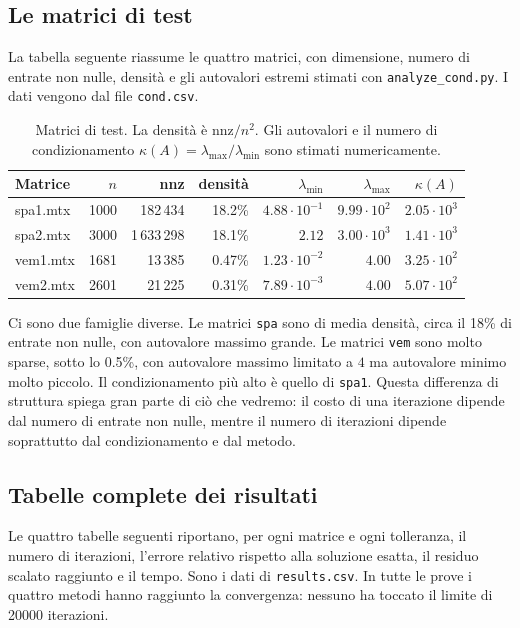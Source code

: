 \documentclass[11pt,a4paper]{article}
\begin{document}
\subsection{Le matrici di test}
La tabella seguente riassume le quattro matrici, con dimensione,
numero di entrate non nulle, densità e gli autovalori estremi stimati con
\texttt{analyze\_cond.py}. I dati vengono dal file \texttt{cond.csv}.

\begin{table}[H]
\centering
\caption{Matrici di test. La densità è $\text{nnz}/n^2$. Gli autovalori e il
numero di condizionamento $\kappa(A)=\lambda_{\max}/\lambda_{\min}$ sono stimati
numericamente.}
\label{tab:matrici}
\begin{tabular}{lrrrrrr}
\toprule
Matrice & $n$ & nnz & densità & $\lambda_{\min}$ & $\lambda_{\max}$ & $\kappa(A)$ \\
\midrule
spa1.mtx & 1000 & 182\,434 & 18.2\% & $4.88\cdot10^{-1}$ & $9.99\cdot10^{2}$ & $2.05\cdot10^{3}$ \\
spa2.mtx & 3000 & 1\,633\,298 & 18.1\% & $2.12$ & $3.00\cdot10^{3}$ & $1.41\cdot10^{3}$ \\
vem1.mtx & 1681 & 13\,385 & 0.47\% & $1.23\cdot10^{-2}$ & $4.00$ & $3.25\cdot10^{2}$ \\
vem2.mtx & 2601 & 21\,225 & 0.31\% & $7.89\cdot10^{-3}$ & $4.00$ & $5.07\cdot10^{2}$ \\
\bottomrule
\end{tabular}
\end{table}

\noindent Ci sono due famiglie diverse. Le matrici
\texttt{spa} sono di media densità, circa il 18\% di entrate non nulle, con
autovalore massimo grande. Le matrici \texttt{vem} sono molto sparse, sotto lo
0.5\%, con autovalore massimo limitato a $4$ ma autovalore minimo molto piccolo.
Il condizionamento più alto è quello di \texttt{spa1}. Questa differenza di
struttura spiega gran parte di ciò che vedremo: il costo di una iterazione
dipende dal numero di entrate non nulle, mentre il numero di iterazioni dipende
soprattutto dal condizionamento e dal metodo.

\subsection{Tabelle complete dei risultati}
Le quattro tabelle seguenti riportano, per ogni matrice e ogni
tolleranza, il numero di iterazioni, l'errore relativo rispetto alla soluzione
esatta, il residuo scalato raggiunto e il tempo. Sono i dati di
\texttt{results.csv}. In tutte le prove i quattro metodi hanno raggiunto la
convergenza: nessuno ha toccato il limite di 20000 iterazioni.
\end{document}
